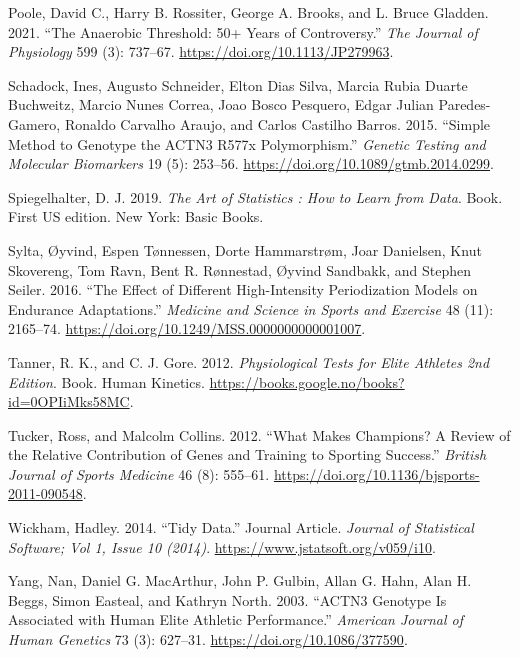 \documentclass[
  letterpaper,
  DIV=11,
  numbers=noendperiod]{scrreprt}
\newlength{\cslhangindent}
\newenvironment{CSLReferences}[2] %
 {\begin{list}{}{%
  \setlength{\itemindent}{0pt}
  \setlength{\leftmargin}{0pt}
  \setlength{\parsep}{0pt}
  \ifodd #1
   \setlength{\leftmargin}{\cslhangindent}
   \setlength{\itemindent}{-1\cslhangindent}
  \fi
  \setlength{\itemsep}{#2\baselineskip}}}
 {\end{list}}
\begin{document}
\begin{CSLReferences}{1}{0}
Poole, David C., Harry B. Rossiter, George A. Brooks, and L. Bruce
Gladden. 2021. {``The Anaerobic Threshold: 50+ Years of Controversy.''}
\emph{The Journal of Physiology} 599 (3): 737--67.
\url{https://doi.org/10.1113/JP279963}.

Schadock, Ines, Augusto Schneider, Elton Dias Silva, Marcia Rubia Duarte
Buchweitz, Marcio Nunes Correa, Joao Bosco Pesquero, Edgar Julian
Paredes-Gamero, Ronaldo Carvalho Araujo, and Carlos Castilho Barros.
2015. {``Simple Method to Genotype the ACTN3 R577x Polymorphism.''}
\emph{Genetic Testing and Molecular Biomarkers} 19 (5): 253--56.
\url{https://doi.org/10.1089/gtmb.2014.0299}.

Spiegelhalter, D. J. 2019. \emph{The Art of Statistics : How to Learn
from Data}. Book. First US edition. New York: Basic Books.

Sylta, Øyvind, Espen Tønnessen, Dorte Hammarstrøm, Joar Danielsen, Knut
Skovereng, Tom Ravn, Bent R. Rønnestad, Øyvind Sandbakk, and Stephen
Seiler. 2016. {``The Effect of Different High-Intensity Periodization
Models on Endurance Adaptations.''} \emph{Medicine and Science in Sports
and Exercise} 48 (11): 2165--74.
\url{https://doi.org/10.1249/MSS.0000000000001007}.

Tanner, R. K., and C. J. Gore. 2012. \emph{Physiological Tests for Elite
Athletes 2nd Edition}. Book. Human Kinetics.
\url{https://books.google.no/books?id=0OPIiMks58MC}.

Tucker, Ross, and Malcolm Collins. 2012. {``What Makes Champions? A
Review of the Relative Contribution of Genes and Training to Sporting
Success.''} \emph{British Journal of Sports Medicine} 46 (8): 555--61.
\url{https://doi.org/10.1136/bjsports-2011-090548}.

Wickham, Hadley. 2014. {``Tidy Data.''} Journal Article. \emph{Journal
of Statistical Software; Vol 1, Issue 10 (2014)}.
\url{https://www.jstatsoft.org/v059/i10}.

Yang, Nan, Daniel G. MacArthur, John P. Gulbin, Allan G. Hahn, Alan H.
Beggs, Simon Easteal, and Kathryn North. 2003. {``ACTN3 Genotype Is
Associated with Human Elite Athletic Performance.''} \emph{American
Journal of Human Genetics} 73 (3): 627--31.
\url{https://doi.org/10.1086/377590}.

\end{CSLReferences}
\end{document}

